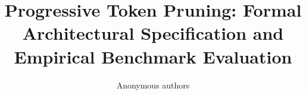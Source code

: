 \title{\textbf{Progressive Token Pruning: Formal Architectural Specification and Empirical Benchmark Evaluation}}

\author{Anonymous authors}
